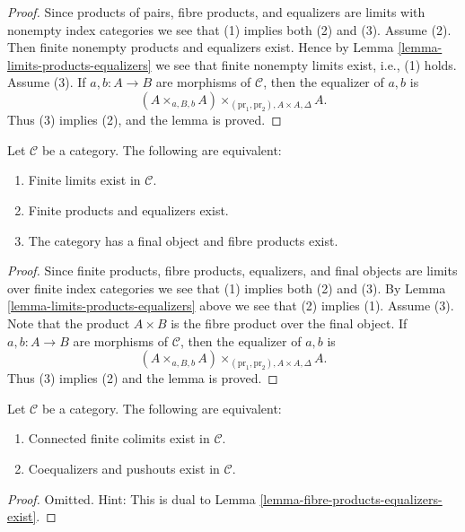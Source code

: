 \begin{proof}
Since products of pairs, fibre products, and equalizers are limits with
nonempty index categories we see that (1) implies both (2) and (3).
Assume (2). Then finite nonempty products and equalizers exist. Hence by
Lemma \ref{lemma-limits-products-equalizers}
we see that finite nonempty limits exist, i.e., (1) holds. Assume (3).
If $a, b : A \to B$ are morphisms of $\mathcal{C}$, then the
equalizer of $a, b$ is
$$
(A \times_{a, B, b} A)\times_{(\text{pr}_1, \text{pr}_2), A \times A, \Delta} A.
$$
Thus (3) implies (2), and the lemma is proved.
\end{proof}

\begin{lemma}
\label{lemma-finite-limits-exist}
Let $\mathcal{C}$ be a category.
The following are equivalent:
\begin{enumerate}
\item Finite limits exist in $\mathcal{C}$.
\item Finite products and equalizers exist.
\item The category has a final object and fibre products exist.
\end{enumerate}
\end{lemma}

\begin{proof}
Since finite products, fibre products, equalizers, and final objects
are limits over finite index categories we see that (1) implies both (2)
and (3). By
Lemma \ref{lemma-limits-products-equalizers}
above we see that (2) implies (1). Assume (3).
Note that the product $A \times B$ is the fibre product over the
final object. If $a, b : A \to B$ are morphisms of $\mathcal{C}$, then the
equalizer of $a, b$ is
$$
(A \times_{a, B, b} A)\times_{(\text{pr}_1, \text{pr}_2), A \times A, \Delta} A.
$$
Thus (3) implies (2) and the lemma is proved.
\end{proof}

\begin{lemma}
\label{lemma-push-outs-coequalizers-exist}
Let $\mathcal{C}$ be a category.
The following are equivalent:
\begin{enumerate}
\item Connected finite colimits exist in $\mathcal{C}$.
\item Coequalizers and pushouts exist in $\mathcal{C}$.
\end{enumerate}
\end{lemma}

\begin{proof}
Omitted. Hint: This is dual to
Lemma \ref{lemma-fibre-products-equalizers-exist}.
\end{proof}

